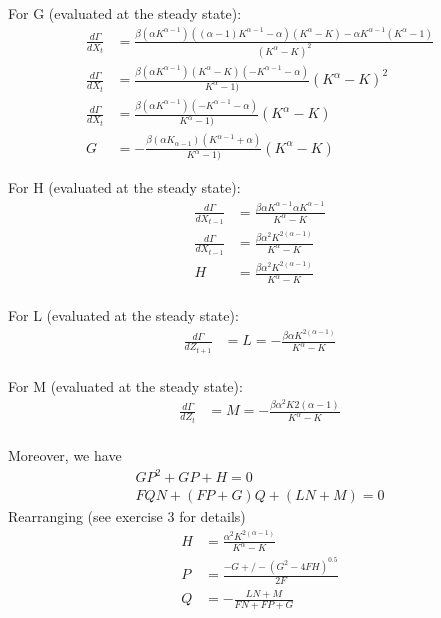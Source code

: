 \documentclass[11pt]{article}
\numberwithin{equation}{section}
\theoremstyle{plain}
\theoremstyle{definition}
\newcommand{\1}{\mathbbm 1}
\def\a{\alpha}
\def\b{\beta}
\begin{document}
For G (evaluated at the steady state):
\begin{align}
	\frac{d\Gamma}{d X_{t}} &= \frac{\b (\a K^{\a-1})((\a -1)K^{\a - 1}-\a)(K^\a - K) - \a K^{\a -1} (K^\a - 1)}{(K^\a-K)^2} \\
	\frac{d\Gamma}{d X_{t}} &= \frac{\b (\a K^{\a-1})(K^\a - K)(-K^{\a-1} - \a)}{K^\a - 1)}{(K^\a-K)^2}\\
	\frac{ d\Gamma}{d X_{t}} &= \frac{\b (\a K^{\a-1})(-K^{\a-1} - \a)}{K^\a - 1)}{(K^\a-K)}\\
	G &= -\frac{\b (\a K_{\a-1})(K^{\a-1} + \a)}{K^\a - 1)}{(K^\a-K)}
\end{align}

For H (evaluated at the steady state):
\begin{align}
	\frac{d\Gamma}{d X_{t-1}} &= \frac{\b \a K^{\a-1}\a K^{\a-1}}{K^\a - K}\\
	\frac{d\Gamma}{d X_{t-1}} &= \frac{\b \a^2 K^{2(\a-1)}}{K^\a - K}\\
	H &= \frac{\b \a^2 K^{2(\a-1)}}{K^\a - K}\\
\end{align}

For L (evaluated at the steady state):
\begin{align}
	\frac{d\Gamma}{d Z_{t+1}} &= L = - \frac{\b \a K^{2(\a-1)}}{K^\a - K}\\
\end{align}

For M (evaluated at the steady state):
\begin{align}
	\frac{d\Gamma}{d Z_{t}} &= M = - \frac{\b \a^2 K{2(\a-1)}}{K^\a - K}\\
\end{align}

Moreover, we have
\begin{align}
GP^2 + GP + H = 0 \\
FQN + (FP + G) Q + (LN + M) = 0
\end{align}
Rearranging (see exercise 3 for details)
\begin{align}
H &= \frac{\a^2 K^{2(\a-1)}}{K^\a - K}\\
P &= \frac{-G +/- (G^2 - 4FH)^{0.5}}{2F}\\
Q &= - \frac{LN + M}{FN + FP + G}
\end{align}
\end{document}
